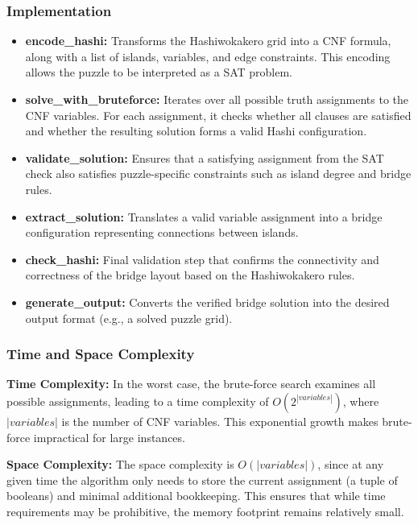 \subsubsection{Implementation}
\begin{itemize}
	\item \textbf{encode\_hashi:} Transforms the Hashiwokakero grid into a CNF formula, along with a list of islands, variables, and edge constraints. This encoding allows the puzzle to be interpreted as a SAT problem.

	\item \textbf{solve\_with\_bruteforce:} Iterates over all possible truth assignments to the CNF variables. For each assignment, it checks whether all clauses are satisfied and whether the resulting solution forms a valid Hashi configuration.

	\item \textbf{validate\_solution:} Ensures that a satisfying assignment from the SAT check also satisfies puzzle-specific constraints such as island degree and bridge rules.

	\item \textbf{extract\_solution:} Translates a valid variable assignment into a bridge configuration representing connections between islands.

	\item \textbf{check\_hashi:} Final validation step that confirms the connectivity and correctness of the bridge layout based on the Hashiwokakero rules.

	\item \textbf{generate\_output:} Converts the verified bridge solution into the desired output format (e.g., a solved puzzle grid).
\end{itemize}

\subsubsection{Time and Space Complexity}
\textbf{Time Complexity:} In the worst case, the brute-force search examines all possible assignments, leading to a time complexity of \(O(2^{|variables|} )\), where \(|variables|\) is the number of CNF variables. This exponential growth makes brute-force impractical for large instances.

\textbf{Space Complexity:} The space complexity is \(O(|variables|)\), since at any given time the algorithm only needs to store the current assignment (a tuple of booleans) and minimal additional bookkeeping. This ensures that while time requirements may be prohibitive, the memory footprint remains relatively small.

